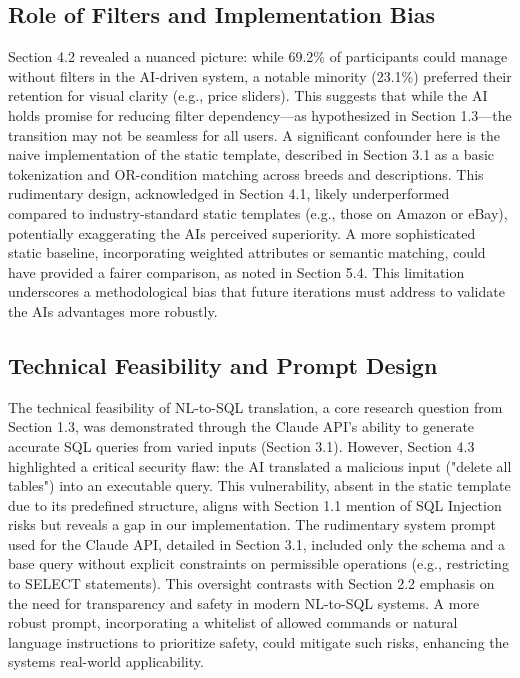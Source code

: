 \documentclass[../../submission.tex]{subfiles}
\begin{document}
\subsection{Role of Filters and Implementation Bias}
Section 4.2 revealed a nuanced picture: while 69.2\% of participants could manage without 
filters in the AI-driven system, a notable minority (23.1\%) preferred their retention for visual 
clarity (e.g., price sliders). This suggests that while the AI holds promise for reducing filter 
dependency—as hypothesized in Section 1.3—the transition may not be seamless for all users. A 
significant confounder here is the naive implementation of the static template, described in Section 
3.1 as a basic tokenization and OR-condition matching across breeds and descriptions. This rudimentary 
design, acknowledged in Section 4.1, likely underperformed compared to industry-standard static 
templates (e.g., those on Amazon or eBay), potentially exaggerating the AIs perceived superiority. 
A more sophisticated static baseline, incorporating weighted attributes or semantic matching, could 
have provided a fairer comparison, as noted in Section 5.4. This limitation underscores a methodological 
bias that future iterations must address to validate the AIs advantages more robustly.

\subsection{Technical Feasibility and Prompt Design}
The technical feasibility of NL-to-SQL translation, a core research question from Section 1.3, 
was demonstrated through the Claude API’s ability to generate accurate SQL queries from varied 
inputs (Section 3.1). However, Section 4.3 highlighted a critical security flaw: the AI translated a 
malicious input ("delete all tables") into an executable query. This vulnerability, absent in the static 
template due to its predefined structure, aligns with Section 1.1 mention of SQL Injection risks but 
reveals a gap in our implementation. The rudimentary system prompt used for the Claude API, detailed in 
Section 3.1, included only the schema and a base query without explicit constraints on permissible 
operations (e.g., restricting to SELECT statements). This oversight contrasts with Section 2.2 emphasis on 
the need for transparency and safety in modern NL-to-SQL systems. A more robust prompt, incorporating a whitelist 
of allowed commands or natural language instructions to prioritize safety, could mitigate such risks, 
enhancing the systems real-world applicability.
\end{document}
